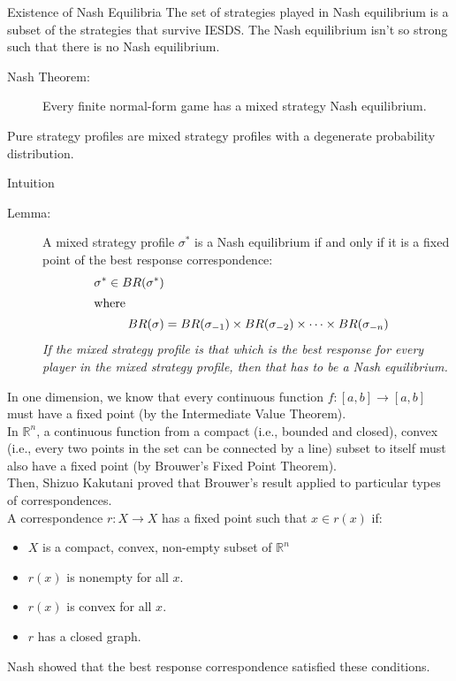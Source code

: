 \documentclass[8pt]{extarticle}
\begin{document}
  \begin{problem}{Existence of Nash Equilibria}
    The set of strategies played in Nash equilibrium is a subset of the strategies that survive IESDS. The Nash equilibrium isn't so strong such that there is no Nash equilibrium.

    \begin{description}
      \item[Nash Theorem:] Every finite normal-form game has a mixed strategy Nash equilibrium.
    \end{description}
    \begin{description}
      \tiny
      \item[Note:] Pure strategy profiles are mixed strategy profiles with a degenerate probability distribution.
    \end{description}
    \begin{problem}{Intuition}
      \begin{description}
        \item[Lemma:] A mixed strategy profile $\sigma^*$ is a Nash equilibrium if and only if it is a fixed point of the best response correspondence:
          \begin{align*}
            \sigma^* \in BR(\sigma^*)\\
            \shortintertext{where}
            BR(\sigma) &= BR(\sigma_{-1}) \times BR(\sigma_{-2})\times\cdots\times BR(\sigma_{-n})
          \end{align*}
          \textit{If the mixed strategy profile is that which is the best response for every player in the mixed strategy profile, then that has to be a Nash equilibrium.}
      \end{description}
      In one dimension, we know that every continuous function $f: [a,b] \rightarrow [a,b]$ must have a fixed point (by the Intermediate Value Theorem).\\

      In $\mathbb{R}^n$, a continuous function from a compact (i.e., bounded and closed), convex (i.e., every two points in the set can be connected by a line) subset to itself must also have a fixed point (by Brouwer's Fixed Point Theorem).\\

      Then, Shizuo Kakutani proved that Brouwer's result applied to particular types of correspondences.\\

      A correspondence $r: X\rightarrow X$ has a fixed point such that $x\in r(x)$ if:
      \begin{itemize}
        \item $X$ is a compact, convex, non-empty subset of $\mathbb{R}^n$
        \item $r(x)$ is nonempty for all $x$.
        \item $r(x)$ is convex for all $x$.
        \item $r$ has a closed graph.
      \end{itemize}
      Nash showed that the best response correspondence satisfied these conditions.
    \end{problem}
  \end{problem}
\end{document}
